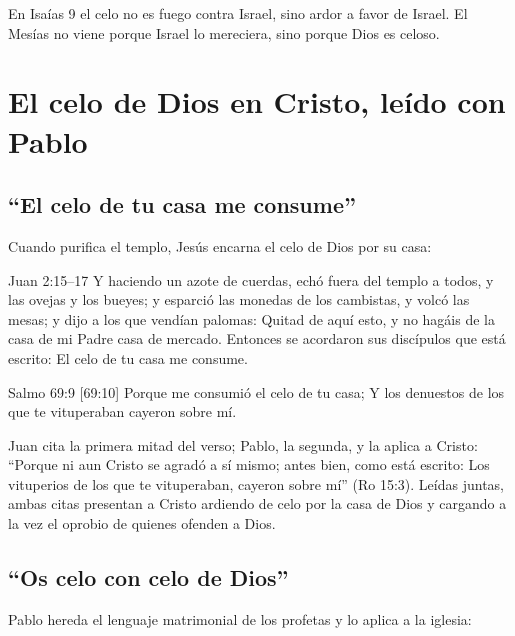 En Isaías 9 el celo no es fuego contra Israel, sino ardor a favor de Israel. El Mesías no viene porque Israel lo mereciera, sino porque Dios es celoso.


\section{El celo de Dios en Cristo, leído con Pablo}

\subsection{“El celo de tu casa me consume”}
Cuando purifica el templo, Jesús encarna el celo de Dios por su casa:

\begin{verso}{Juan 2:15–17}
Y haciendo un azote de cuerdas, echó fuera del templo a todos, y las ovejas y los bueyes; y esparció las monedas de los cambistas, y volcó las mesas; y dijo a los que vendían palomas: Quitad de aquí esto, y no hagáis de la casa de mi Padre casa de mercado. Entonces se acordaron sus discípulos que está escrito: El celo de tu casa me consume.
\end{verso}

\begin{verso}{Salmo 69:9 [69:10]}
Porque me consumió el celo de tu casa; Y los denuestos de los que te vituperaban cayeron sobre mí.
\end{verso}

Juan cita la primera mitad del verso; Pablo, la segunda, y la aplica a Cristo: ``Porque ni aun Cristo se agradó a sí mismo; antes bien, como está escrito: Los vituperios de los que te vituperaban, cayeron sobre mí'' (Ro 15:3). Leídas juntas, ambas citas presentan a Cristo ardiendo de celo por la casa de Dios y cargando a la vez el oprobio de quienes ofenden a Dios.


\subsection{“Os celo con celo de Dios”}
Pablo hereda el lenguaje matrimonial de los profetas y lo aplica a la iglesia:

